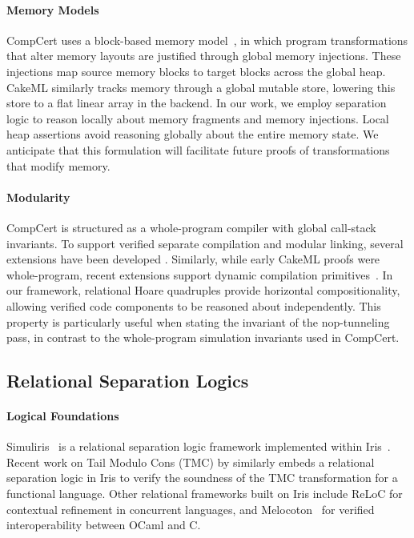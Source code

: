 \documentclass[report.tex]{subfiles}
\begin{document}
\paragraph{Memory Models}
CompCert uses a block-based memory model~\parencite{leroy-08-memory},
in which program transformations that alter memory layouts
are justified through global memory injections.
These injections map source memory blocks to target blocks
across the global heap.
CakeML similarly tracks memory through a global mutable store,
lowering this store to a flat linear array in the backend.
In our work,
we employ separation logic to reason locally
about memory fragments and memory injections.
Local heap assertions avoid reasoning globally
about the entire memory state.
We anticipate that this formulation will facilitate future proofs
of transformations that modify memory.

\paragraph{Modularity}
CompCert is structured as a whole-program compiler
with global call-stack invariants.
To support verified separate compilation and modular linking,
several extensions have been developed
\parencite{stewart-15-compcomp,kang-16-light}.
Similarly,
while early CakeML proofs were whole-program,
recent extensions support dynamic compilation
primitives~\parencite{sewell-23-cakes}.
In our framework,
relational Hoare quadruples provide horizontal compositionality,
allowing verified code components to be reasoned about independently.
This property is particularly useful when stating the invariant
of the nop-tunneling pass,
in contrast to the whole-program simulation invariants used in CompCert.

\subsection{Relational Separation Logics}
\label{sec:related-logics}

\paragraph{Logical Foundations}
Simuliris~\parencite{gaher-22-simuliris} is a relational separation logic
framework implemented within Iris~\parencite{jung-18-iris}.
Recent work on Tail Modulo Cons (TMC) by \textcite{allain-25-tmc}
similarly embeds a relational separation logic in Iris
to verify the soundness of the TMC transformation
for a functional language.
Other relational frameworks built on Iris include ReLoC
\parencite{frumin-21-reloc}
for contextual refinement in concurrent languages,
and Melocoton~\parencite{gueneau-23-melocoton}
for verified interoperability between OCaml and C.
\end{document}
